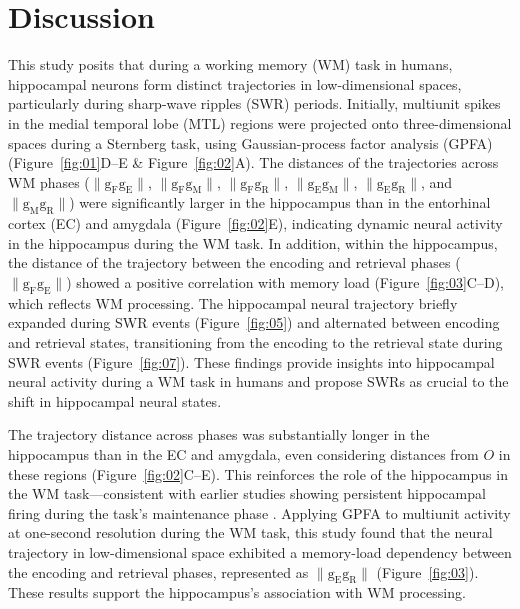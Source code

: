 \section{Discussion}
This study posits that during a working memory (WM) task in humans, hippocampal neurons form distinct trajectories in low-dimensional spaces, particularly during sharp-wave ripples (SWR) periods. Initially, multiunit spikes in the medial temporal lobe (MTL) regions were projected onto three-dimensional spaces during a Sternberg task, using Gaussian-process factor analysis (GPFA) (Figure~\ref{fig:01}D--E \& Figure~\ref{fig:02}A). The distances of the trajectories across WM phases ($\mathrm{\lVert g_{F}g_{E} \rVert}$, $\mathrm{\lVert g_{F}g_{M} \rVert}$, $\mathrm{\lVert g_{F}g_{R} \rVert}$, $\mathrm{\lVert g_{E}g_{M} \rVert}$, $\mathrm{\lVert g_{E}g_{R} \rVert}$, and $\mathrm{\lVert g_{M}g_{R} \rVert}$) were significantly larger in the hippocampus than in the entorhinal cortex (EC) and amygdala (Figure~\ref{fig:02}E), indicating dynamic neural activity in the hippocampus during the WM task. In addition, within the hippocampus, the distance of the trajectory between the encoding and retrieval phases ($\mathrm{\lVert g_{F}g_{E} \rVert}$) showed a positive correlation with memory load (Figure~\ref{fig:03}C--D), which reflects WM processing. The hippocampal neural trajectory briefly expanded during SWR events (Figure~\ref{fig:05}) and alternated between encoding and retrieval states, transitioning from the encoding to the retrieval state during SWR events (Figure~\ref{fig:07}). These findings provide insights into hippocampal neural activity during a WM task in humans and propose SWRs as crucial to the shift in hippocampal neural states.

The trajectory distance across phases was substantially longer in the hippocampus than in the EC and amygdala, even considering distances from $O$ in these regions (Figure~\ref{fig:02}C--E). This reinforces the role of the hippocampus in the WM task—consistent with earlier studies showing persistent hippocampal firing during the task's maintenance phase \cite{boran_persistent_2019} \cite{kaminski_persistently_2017} \cite{kornblith_persistent_2017} \cite{faraut_dataset_2018}. Applying GPFA to multiunit activity at one-second resolution during the WM task, this study found that the neural trajectory in low-dimensional space exhibited a memory-load dependency between the encoding and retrieval phases, represented as $\mathrm{\lVert g_{E}g_{R} \rVert}$ (Figure~\ref{fig:03}). These results support the hippocampus's association with WM processing.

